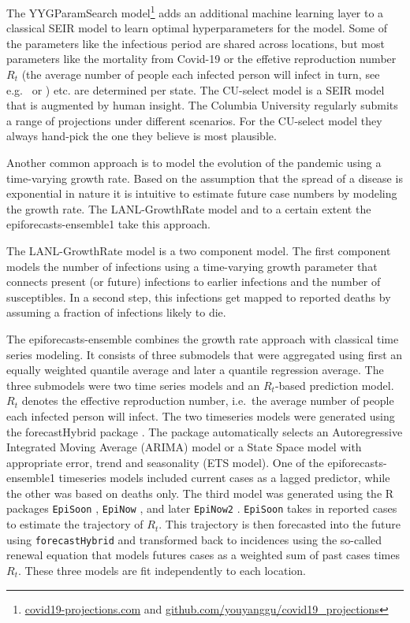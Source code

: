 \documentclass[
]{book}
\begin{document}
The YYGParamSearch model\footnote{\href{https://covid19-projections.com}{covid19-projections.com} and \href{https://github.com/youyanggu/covid19_projections}{github.com/youyanggu/covid19\_projections}} adds an additional machine learning layer to a classical SEIR model to learn optimal hyperparameters for the model. Some of the parameters like the infectious period are shared across locations, but most parameters like the mortality from Covid-19 or the effetive reproduction number \(R_t\) (the average number of people each infected person will infect in turn, see e.g.~\citet{nishiuraEffectiveReproductionNumber2009} or \citet{coriNewFrameworkSoftware2013}) etc. are determined per state.
The CU-select model is a SEIR model that is augmented by human insight. The Columbia University regularly submits a range of projections under different scenarios. For the CU-select model they always hand-pick the one they believe is most plausible.

Another common approach is to model the evolution of the pandemic using a time-varying growth rate. Based on the assumption that the spread of a disease is exponential in nature it is intuitive to estimate future case numbers by modeling the growth rate. The LANL-GrowthRate model and to a certain extent the epiforecasts-ensemble1 take this approach.

The LANL-GrowthRate model is a two component model. The first component models the number of infections using a time-varying growth parameter that connects present (or future) infections to earlier infections and the number of susceptibles. In a second step, this infections get mapped to reported deaths by assuming a fraction of infections likely to die.

The epiforecasts-ensemble combines the growth rate approach with classical time series modeling. It consists of three submodels that were aggregated using first an equally weighted quantile average and later a quantile regression average. The three submodels were two time series models and an \(R_t\)-based prediction model. \(R_t\) denotes the effective reproduction number, i.e.~the average number of people each infected person will infect. The two timeseries models were generated using the forecastHybrid package \citep{R-forecastHybrid}. The package automatically selects an Autoregressive Integrated Moving Average (ARIMA) model or a State Space model with appropriate error, trend and seasonality (ETS model). One of the epiforecasts-ensemble1 timeseries models included current cases as a lagged predictor, while the other was based on deaths only. The third model was generated using the R packages \texttt{EpiSoon} \citep{R-EpiSoon}, \texttt{EpiNow} \citep{R-EpiNow}, and later \texttt{EpiNow2} \citep{R-EpiNow2}. \texttt{EpiSoon} takes in reported cases to estimate the trajectory of \(R_t\). This trajectory is then forecasted into the future using \texttt{forecastHybrid} and transformed back to incidences using the so-called renewal equation that models futures cases as a weighted sum of past cases times \(R_t\). These three models are fit independently to each location.
\end{document}
